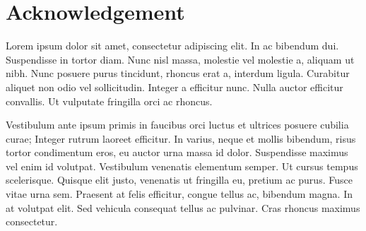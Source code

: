 \chapter*{Acknowledgement}

Lorem ipsum dolor sit amet, consectetur adipiscing elit. In ac bibendum dui. Suspendisse in tortor diam. Nunc nisl massa, molestie vel molestie a, aliquam ut nibh. Nunc posuere purus tincidunt, rhoncus erat a, interdum ligula. Curabitur aliquet non odio vel sollicitudin. Integer a efficitur nunc. Nulla auctor efficitur convallis. Ut vulputate fringilla orci ac rhoncus.

Vestibulum ante ipsum primis in faucibus orci luctus et ultrices posuere cubilia curae; Integer rutrum laoreet efficitur. In varius, neque et mollis bibendum, risus tortor condimentum eros, eu auctor urna massa id dolor. Suspendisse maximus vel enim id volutpat. Vestibulum venenatis elementum semper. Ut cursus tempus scelerisque. Quisque elit justo, venenatis ut fringilla eu, pretium ac purus. Fusce vitae urna sem. Praesent at felis efficitur, congue tellus ac, bibendum magna. In at volutpat elit. Sed vehicula consequat tellus ac pulvinar. Cras rhoncus maximus consectetur.
